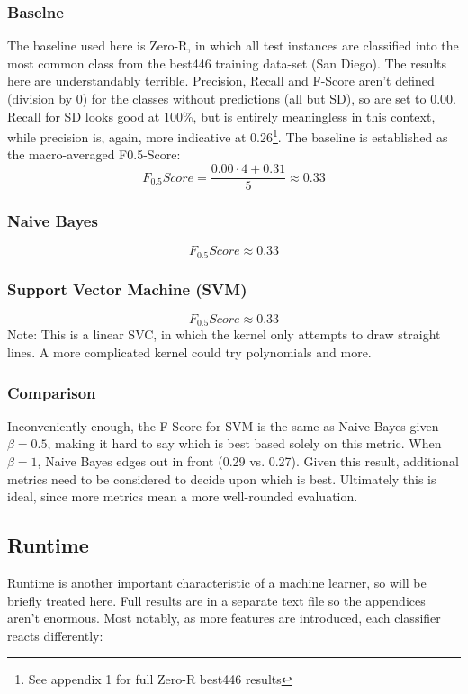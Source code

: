 \documentclass[twocolumn]{article}
\begin{document}
\subsubsection{Baselne}
The baseline used here is Zero-R, in which all test instances are classified into the most common class from the best446 training data-set (San Diego). The results here are understandably terrible. Precision, Recall and F-Score aren't defined (division by 0) for the classes without predictions (all but SD), so are set to 0.00. Recall for SD looks good at 100\%, but is entirely meaningless in this context, while precision is, again, more indicative at 0.26\footnote{See appendix 1 for full Zero-R best446 results}. The baseline is established as the macro-averaged F0.5-Score:
\begin{equation}
F_{0.5}Score = \frac{0.00 \cdot 4 + 0.31}{5} \approx 0.33
\end{equation}

\subsubsection{Naive Bayes}
\begin{equation}
F_{0.5}Score \approx 0.33
\end{equation}
\subsubsection{Support Vector Machine (SVM)}
\begin{equation}
F_{0.5}Score \approx 0.33
\end{equation}
Note: This is a linear SVC, in which the kernel only attempts to draw straight lines. A more complicated kernel could try polynomials and more.

\subsubsection{Comparison}
Inconveniently enough, the F-Score for SVM is the same as Naive Bayes given $\beta = 0.5$, making it hard to say which is best based solely on this metric. When $\beta = 1$, Naive Bayes edges out in front (0.29 vs. 0.27). Given this result, additional metrics need to be considered to decide upon which is best. Ultimately this is ideal, since more metrics mean a more well-rounded evaluation.

\subsection{Runtime}
Runtime is another important characteristic of a machine learner, so will be briefly treated here. Full results are in a separate text file so the appendices aren't enormous. Most notably, as more features are introduced, each classifier reacts differently:
\end{document}
